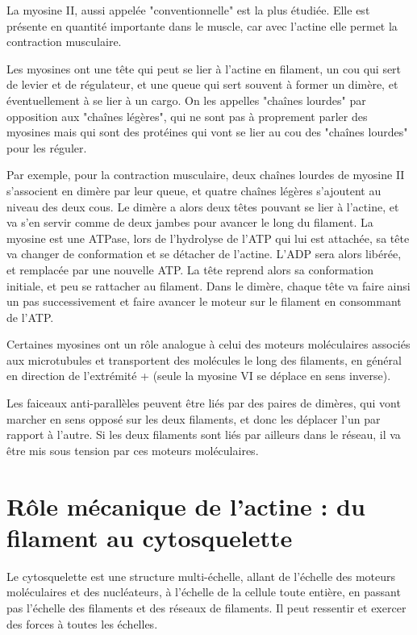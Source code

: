 \documentclass{report}
\begin{document}
La myosine II, aussi appelée "conventionnelle" est la plus étudiée. Elle est présente en quantité importante dans le muscle, car avec l'actine elle permet la contraction musculaire. 

Les myosines ont une tête qui peut se lier à l'actine en filament, un cou  qui sert de levier et de régulateur, et une queue qui sert souvent à former un dimère, et éventuellement à se lier à un cargo. On les appelles "chaînes lourdes" par opposition aux "chaînes légères", qui ne sont pas à proprement parler des myosines mais qui sont des protéines qui vont se lier au cou des "chaînes lourdes" pour les réguler. 

Par exemple, pour la contraction musculaire, deux chaînes lourdes de myosine II s'associent en dimère par leur queue, et quatre chaînes légères s'ajoutent au niveau des deux cous. Le dimère a alors deux têtes pouvant se lier à l'actine, et va s'en servir comme de deux jambes pour avancer le long du filament. 
La myosine est une ATPase, lors de l'hydrolyse de l'ATP qui lui est attachée, sa tête va changer de conformation et se détacher de l'actine. L'ADP sera alors libérée, et remplacée par une nouvelle ATP.  La tête reprend alors sa conformation initiale, et peu se rattacher au filament. Dans le dimère, chaque tête va faire ainsi un pas successivement et faire avancer le moteur sur le filament en consommant de l'ATP. 



Certaines myosines ont un rôle analogue à celui des moteurs moléculaires associés aux microtubules et transportent des molécules le long des filaments, en général en direction de l'extrémité + (seule la myosine VI se déplace en sens inverse). 


Les faiceaux anti-parallèles peuvent être liés par des paires de dimères, qui vont marcher en sens opposé sur les deux filaments, et donc les déplacer l'un par rapport à l'autre. Si les deux filaments sont liés par ailleurs dans le réseau, il va être mis sous tension par ces moteurs moléculaires.




\section{Rôle mécanique de l'actine : du filament au cytosquelette}

Le cytosquelette est une structure multi-échelle, allant de l'échelle des moteurs moléculaires et des nucléateurs, à l'échelle de la cellule toute entière, en passant pas l'échelle des filaments et des réseaux de filaments. Il peut ressentir et exercer des forces à toutes les échelles. 
\end{document}
